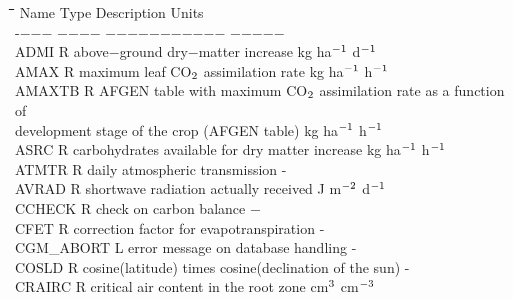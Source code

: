 \begin{tabbing}
\hspace{1.27cm}\=\hspace{1.27cm}\=\hspace{1.27cm}\=\hspace{1.27cm}\=%
\hspace{1.27cm}\=\hspace{1.27cm}\=\hspace{1.27cm}\=\hspace{1.27cm}\=%
\hspace{1.27cm}\=\hspace{1.27cm}\=\kill
Name    \> \> Type   \> Description                                        \> \> \> \> \> \> \> Units\\
-$-$$-$$-$    \> \> $-$$-$$-$$-$   \> $-$$-$$-$$-$$-$$-$$-$$-$$-$$-$$-$                                        \> \> \> \> \> \> \> $-$$-$$-$$-$$-$ \\
ADMI    \> \> R   \> above$-$ground dry$-$matter increase                   \> \> \> \> \> \> \> kg ha$^{{\rm -1}}$ d$^{{\rm -1}}$\\
AMAX    \> \> R   \> maximum leaf CO$_{{\rm 2}}$ assimilation rate                 \> \> \> \> \> \> \> kg ha$^{{\rm -1}}$ h$^{{\rm -1}}$\\
AMAXTB\> \> R\> AFGEN table with maximum CO$_{{\rm 2}}$ assimilation rate as a function of\\
\>\> \> development stage of the crop (AFGEN table)\> \> \> \> \> \> \> kg ha$^{{\rm -1}}$ h$^{{\rm -1}}$\\
ASRC    \> \> R   \> carbohydrates available for dry matter increase    \> \> \> \> \> \> \> kg ha$^{{\rm -1}}$ h$^{{\rm -1}}$\\
ATMTR\> \> R\> daily atmospheric transmission\> \> \> \> \> \> \> -\\
AVRAD   \> \> R   \> shortwave radiation actually received              \> \> \> \> \> \> \> J m$^{{\rm -2}}$ d$^{{\rm -1}}$\\
CCHECK  \> \> R   \> check on carbon balance                            \> \> \> \> \> \> \> $-$\\
CFET\> \> R\> correction factor for evapotranspiration\> \> \> \> \> \> \> -\\
CGM\_ABORT\> \> L\> error message on database handling\> \> \> \> \> \> \> -\\
COSLD   \> \> R   \> cosine(latitude) times cosine(declination of the sun)             \> \> \> \> \> \> \> -\\
CRAIRC\> \> R\> critical air content in the root zone\> \> \> \> \> \> \> cm$^{{\rm 3}}$ cm$^{{\rm -3}}$\\
$$
\end{tabbing}
